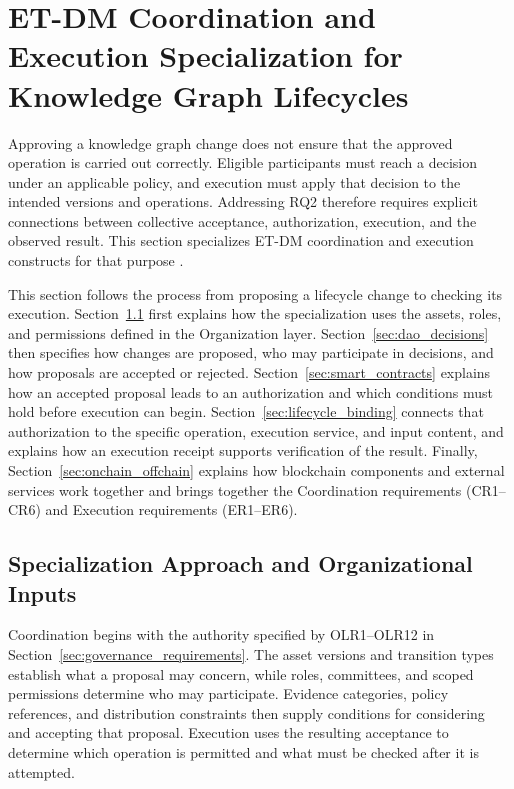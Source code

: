 \documentclass[journal]{IEEEtran}
\begin{document}
\section{ET-DM Coordination and Execution Specialization for Knowledge Graph Lifecycles}
\label{sec:dao_mechanisms}

Approving a knowledge graph change does not ensure that the
approved operation is carried out correctly. Eligible participants
must reach a decision under an applicable policy, and execution
must apply that decision to the intended versions and operations.
Addressing RQ2 therefore requires explicit connections between
collective acceptance, authorization, execution, and the observed
result. This section specializes ET-DM coordination and execution
constructs for that purpose
\cite{Avanzo2025ETDM,Avanzo2025Thesis,Avanzo2026DAOModCoordination}.

This section follows the process from proposing a lifecycle
change to checking its execution.
Section~\ref{sec:etdm_inputs} first explains how the
specialization uses the assets, roles, and permissions
defined in the Organization layer.
Section~\ref{sec:dao_decisions} then specifies how changes
are proposed, who may participate in decisions, and how
proposals are accepted or rejected.
Section~\ref{sec:smart_contracts} explains how an accepted
proposal leads to an authorization and which conditions
must hold before execution can begin.
Section~\ref{sec:lifecycle_binding} connects that authorization
to the specific operation, execution service, and input
content, and explains how an execution receipt supports
verification of the result.
Finally, Section~\ref{sec:onchain_offchain} explains how
blockchain components and external services work together
and brings together the Coordination requirements
(CR1--CR6) and Execution requirements (ER1--ER6).

\subsection{Specialization Approach and Organizational Inputs}
\label{sec:etdm_inputs}

Coordination begins with the authority specified by OLR1--OLR12 in
Section~\ref{sec:governance_requirements}. The asset versions and
transition types establish what a proposal may concern, while roles,
committees, and scoped permissions determine who may participate.
Evidence categories, policy references, and distribution constraints
then supply conditions for considering and accepting that proposal.
Execution uses the resulting acceptance to determine which operation
is permitted and what must be checked after it is attempted.
\end{document}
